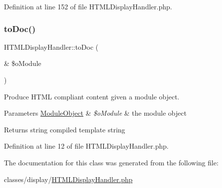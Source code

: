 Definition at line 152 of file H\+T\+M\+L\+Display\+Handler.\+php.

\mbox{\label{classHTMLDisplayHandler_a01d7fabb31ab447663f866efa36118a3}} 
\subsubsection{\texorpdfstring{to\+Doc()}{toDoc()}}
{\footnotesize\ttfamily H\+T\+M\+L\+Display\+Handler\+::to\+Doc (\begin{DoxyParamCaption}\item[{\&}]{\$o\+Module }\end{DoxyParamCaption})}

Produce H\+T\+ML compliant content given a module object.~\newline

\begin{DoxyParams}[1]{Parameters}
\hyperlink{classModuleObject}{Module\+Object} & {\em \$o\+Module} & the module object \\
\hline
\end{DoxyParams}
\begin{DoxyReturn}{Returns}
string compiled template string 
\end{DoxyReturn}


Definition at line 12 of file H\+T\+M\+L\+Display\+Handler.\+php.



The documentation for this class was generated from the following file\+:\begin{DoxyCompactItemize}
\item 
classes/display/\hyperlink{HTMLDisplayHandler_8php}{H\+T\+M\+L\+Display\+Handler.\+php}\end{DoxyCompactItemize}
